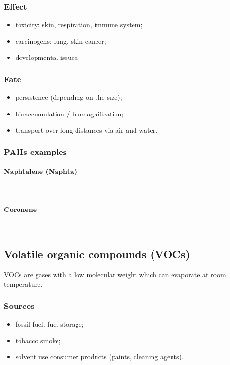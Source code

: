 \documentclass{article}
\newcommand{\pph}[1]{\paragraph{#1}\phantom{}\\}
\begin{document}
\subsubsection{Effect}
\begin{itemize}
    \item toxicity: skin, respiration, immune system;
    \item carcinogens: lung, skin cancer;
    \item developmental issues.
\end{itemize}

\subsubsection{Fate}
\begin{itemize}
    \item persistence (depending on the size);
    \item bioaccumulation / biomagnification;
    \item transport over long distances via air and water.
\end{itemize}

\subsubsection{PAHs examples}

\pph{Naphtalene (Naphta)}
\begin{center}
\end{center}

\pph{Coronene}
\begin{center}
\end{center}

\newpage
\subsection{Volatile organic compounds (VOCs)}
VOCs are gases with a low molecular weight which can evaporate at room temperature.

\subsubsection{Sources}
\begin{itemize}
    \item fossil fuel, fuel storage;
    \item tobacco smoke;
    \item solvent use consumer products (paints, cleaning agents).
\end{itemize}
\end{document}
